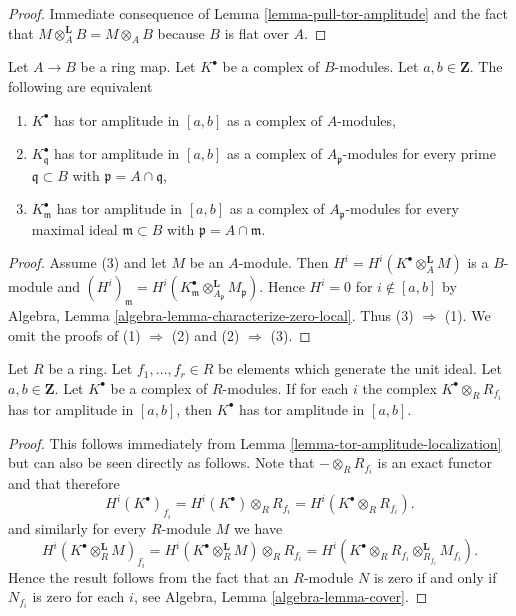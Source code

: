 \begin{proof}
Immediate consequence of
Lemma \ref{lemma-pull-tor-amplitude}
and the fact that $M \otimes_A^{\mathbf{L}} B = M \otimes_A B$
because $B$ is flat over $A$.
\end{proof}

\begin{lemma}
\label{lemma-tor-amplitude-localization}
Let $A  \to B$ be a ring map. Let $K^\bullet$ be a complex of $B$-modules.
Let $a, b \in \mathbf{Z}$. The following are equivalent
\begin{enumerate}
\item $K^\bullet$ has tor amplitude in $[a, b]$ as a complex of $A$-modules,
\item $K^\bullet_\mathfrak q$ has tor amplitude in $[a, b]$ as a complex
of $A_\mathfrak p$-modules for every prime $\mathfrak q \subset B$
with $\mathfrak p = A \cap \mathfrak q$,
\item $K^\bullet_\mathfrak m$ has tor amplitude in $[a, b]$ as a complex
of $A_\mathfrak p$-modules for every maximal ideal $\mathfrak m \subset B$
with $\mathfrak p = A \cap \mathfrak m$.
\end{enumerate}
\end{lemma}

\begin{proof}
Assume (3) and let $M$ be an $A$-module. Then
$H^i = H^i(K^\bullet \otimes_A^\mathbf{L} M)$ is a $B$-module and
$(H^i)_\mathfrak m =
H^i(K^\bullet_\mathfrak m \otimes_{A_\mathfrak p}^\mathbf{L} M_\mathfrak p)$.
Hence $H^i = 0$ for $i \not \in [a, b]$ by
Algebra, Lemma \ref{algebra-lemma-characterize-zero-local}. Thus
(3) $\Rightarrow$ (1). We omit the proofs of (1) $\Rightarrow$ (2)
and (2) $\Rightarrow$ (3).
\end{proof}

\begin{lemma}
\label{lemma-glue-tor-amplitude}
Let $R$ be a ring. Let $f_1, \ldots, f_r \in R$ be elements which
generate the unit ideal. Let $a, b \in \mathbf{Z}$. Let $K^\bullet$
be a complex of $R$-modules. If for each $i$ the complex
$K^\bullet \otimes_R R_{f_i}$ has tor amplitude in $[a, b]$,
then $K^\bullet$ has tor amplitude in $[a, b]$.
\end{lemma}

\begin{proof}
This follows immediately from Lemma \ref{lemma-tor-amplitude-localization}
but can also be seen directly as follows.
Note that $- \otimes_R R_{f_i}$ is an exact functor and that therefore
$$
H^i(K^\bullet)_{f_i} =
H^i(K^\bullet) \otimes_R R_{f_i} = H^i(K^\bullet \otimes_R R_{f_i}).
$$
and similarly for every $R$-module $M$ we have
$$
H^i(K^\bullet \otimes_R^{\mathbf{L}} M)_{f_i} =
H^i(K^\bullet \otimes_R^{\mathbf{L}} M) \otimes_R R_{f_i} =
H^i(K^\bullet \otimes_R R_{f_i} \otimes_{R_{f_i}}^{\mathbf{L}} M_{f_i}).
$$
Hence the result follows from the fact that an $R$-module $N$
is zero if and only if $N_{f_i}$ is zero for each $i$, see
Algebra, Lemma \ref{algebra-lemma-cover}.
\end{proof}

